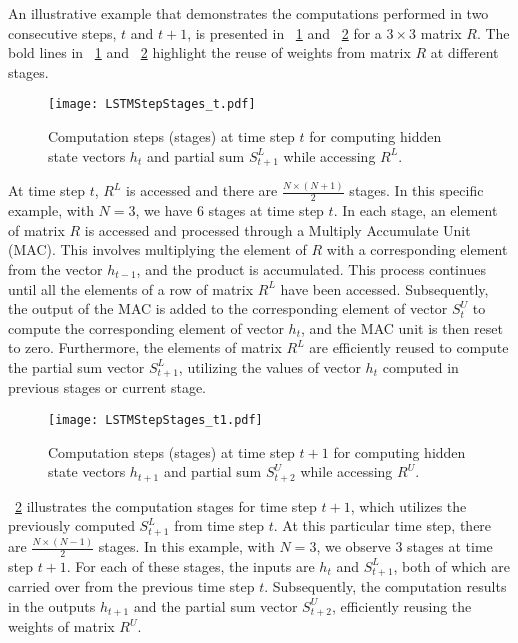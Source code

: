 An illustrative example that demonstrates the computations performed in two consecutive steps, $t$ and $t{+}1$, is presented in \figurename{~\ref{fig:ExampleComputation_t}} and \figurename{~\ref{fig:ExampleComputation_t+1}} for a $3{\times}3$ matrix $R$. The bold lines in \figurename{~\ref{fig:ExampleComputation_t}} and \figurename{~\ref{fig:ExampleComputation_t+1}} highlight the reuse of weights from matrix $R$ at different stages.
\begin{figure}[htbp]
	\centerline{\texttt{[image: LSTMStepStages\_t.pdf]}}
	\caption{Computation steps (stages) at time step $t$ for computing hidden state vectors $h_t$ and partial sum $S^L_{t{+}1}$ while accessing $R^L$.}
	\label{fig:ExampleComputation_t}
\end{figure}

At time step $t$, $R^L$ is accessed and there are $\frac{N{\times}(N{+}1)}{2}$ stages. In this specific example, with $N=3$, we have 6 stages at time step $t$. In each stage, an element of matrix $R$ is accessed and processed through a Multiply Accumulate Unit (MAC). This involves multiplying the element of $R$ with a corresponding element from the vector $h_{t{-}1}$, and the product is accumulated. This process continues until all the elements of a row of matrix $R^L$ have been accessed. Subsequently, the output of the MAC is added to the corresponding element of vector $S^U_{t}$ to compute the corresponding element of vector $h_t$, and the MAC unit is then reset to zero. Furthermore, the elements of matrix $R^L$ are efficiently reused to compute the partial sum vector $S^L_{t{+}1}$, utilizing the values of vector $h_{t}$ computed in previous stages or current stage.
\begin{figure}[htbp]
	\centerline{\texttt{[image: LSTMStepStages\_t1.pdf]}}
	\caption{Computation steps (stages) at time step $t{+}1$ for computing hidden state vectors $h_{t+1}$ and partial sum $S^U_{t{+}2}$ while accessing $R^U$.}
	\label{fig:ExampleComputation_t+1}
\end{figure}

\figurename{~\ref{fig:ExampleComputation_t+1}} illustrates the computation stages for time step $t{+}1$, which utilizes the previously computed $S^L_{t{+}1}$ from time step $t$. At this particular time step, there are $\frac{N{\times}(N{-}1)}{2}$ stages. In this example, with $N=3$, we observe 3 stages at time step $t{+}1$. For each of these stages, the inputs are $h_t$ and $S^L_{t{+}1}$, both of which are carried over from the previous time step $t$. Subsequently, the computation results in the outputs $h_{t{+}1}$ and the partial sum vector $S^U_{t{+}2}$, efficiently reusing the weights of matrix $R^U$.

